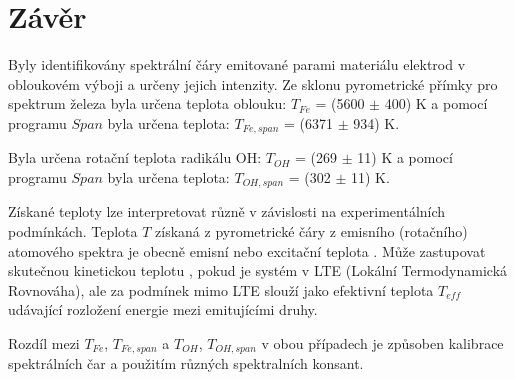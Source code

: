 \documentclass[a4paper,11pt]{article}
\begin{document}
\begin{minipage}[t]{0.5\textwidth}
        \section{Závěr}
                \par Byly identifikovány spektrální čáry emitované parami materiálu elektrod v obloukovém výboji a určeny jejich intenzity. Ze sklonu pyrometrické přímky pro spektrum železa byla určena teplota oblouku: $T_{Fe}$ = (5600 $\pm$ 400) K a pomocí programu $Span$ byla určena teplota: $T_{Fe, span}$ = (6371 $\pm$ 934) K.
                \vspace{10pt}
                \par Byla určena rotační teplota radikálu OH: $T_{OH}$ = (269 $\pm$ 11) K a pomocí programu $Span$ byla určena teplota: $T_{OH, span}$ = (302 $\pm$ 11) K.
                \vspace{10pt}
                \par Získané teploty lze interpretovat různě v závislosti na experimentálních podmínkách. Teplota $T$ získaná z pyrometrické čáry z emisního (rotačního) atomového spektra je obecně emisní nebo excitační teplota \cite{excitation}. Může zastupovat skutečnou kinetickou teplotu \cite{kinetic}, pokud je systém v LTE (Lokální Termodynamická Rovnováha), ale za podmínek mimo LTE slouží jako efektivní teplota $T_{eff}$ \cite{effective} udávající rozložení energie mezi emitujícími druhy.
                \vspace{10pt}
                \par Rozdíl mezi $T_{Fe}$, $T_{Fe, span}$ a $T_{OH}$, $T_{OH, span}$ v obou případech je způsoben kalibrace spektrálních čar a použitím různých spektralních konsant.

                
    \end{minipage}
\newpage
                \renewcommand{\refname}{Odkazy}
\end{document}
